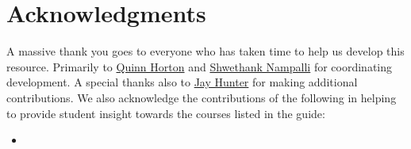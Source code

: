 \chapter{Acknowledgments}
A massive thank you goes to everyone who has taken time to help us develop this resource. Primarily to \href{https://www.linkedin.com/in/quinn-horton/}{Quinn Horton} and \href{https://www.linkedin.com/in/shwethank-nampalli-686782225/}{Shwethank Nampalli} for coordinating development. A special thanks also to \href{https://www.linkedin.com/in/jay-k-hunter/}{Jay Hunter} for making additional contributions.
We also acknowledge the contributions of the following in helping to provide student insight towards the courses listed in the guide:
\begin{itemize}
    \item 
\end{itemize}
